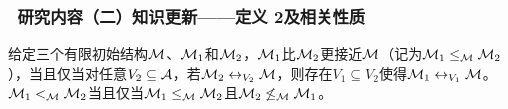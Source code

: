\documentclass[9pt, CJK]{beamer}
\begin{document}
\begin{frame}
	\frametitle{~研究内容（二）知识更新——{\footnotesize 定义 2及相关性质}}
	{\footnotesize
		\begin{definition}\label{def:closer}
			给定三个有限初始结构${\cal M}$、${\cal M}_1$和${\cal M}_2$，${\cal M}_1$比${\cal M}_2$更接近${\cal M}$（记为${\cal M}_1 \leq_{{\cal M}} {\cal M}_2$），当且仅当对任意$V_2 \subseteq {\cal A}$，若${\cal M}_2 \leftrightarrow_{V_2} {\cal M}$，则存在$V_1 \subseteq V_2$使得${\cal M}_1 \leftrightarrow_{V_1} {\cal M}$。
			${\cal M}_1 <_{{\cal M}} {\cal M}_2$当且仅当${\cal M}_1 \leq_{{\cal M}} {\cal M}_2$且${\cal M}_2 \not \leq_{{\cal M}} {\cal M}_1$。
		\end{definition}
		
		}
\end{frame}
\end{document}
